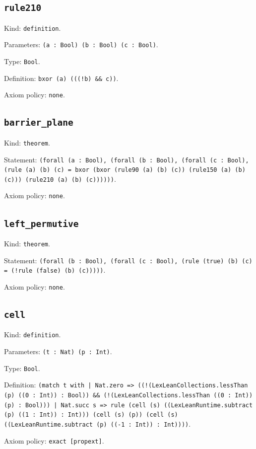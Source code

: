 \documentclass[11pt]{article}
\begin{document}
\subsection*{\texttt{rule210}}
\noindent Kind: \texttt{definition}.\par
\noindent Parameters: \texttt{(a : Bool) (b : Bool) (c : Bool)}.\par
\noindent Type: \texttt{Bool}.\par
\noindent Definition: \texttt{bxor (a) (((!b) \&\& c))}.\par
\noindent Axiom policy: \texttt{none}.\par
\subsection*{\texttt{barrier\_plane}}
\noindent Kind: \texttt{theorem}.\par
\noindent Statement: \texttt{(forall (a : Bool), (forall (b : Bool), (forall (c : Bool), (rule (a) (b) (c) = bxor (bxor (rule90 (a) (b) (c)) (rule150 (a) (b) (c))) (rule210 (a) (b) (c))))))}.\par
\noindent Axiom policy: \texttt{none}.\par
\subsection*{\texttt{left\_permutive}}
\noindent Kind: \texttt{theorem}.\par
\noindent Statement: \texttt{(forall (b : Bool), (forall (c : Bool), (rule (true) (b) (c) = (!rule (false) (b) (c)))))}.\par
\noindent Axiom policy: \texttt{none}.\par
\subsection*{\texttt{cell}}
\noindent Kind: \texttt{definition}.\par
\noindent Parameters: \texttt{(t : Nat) (p : Int)}.\par
\noindent Type: \texttt{Bool}.\par
\noindent Definition: \texttt{(match t with | Nat.zero => ((!(LexLeanCollections.lessThan (p) ((0 : Int)) : Bool)) \&\& (!(LexLeanCollections.lessThan ((0 : Int)) (p) : Bool))) | Nat.succ s => rule (cell (s) ((LexLeanRuntime.subtract (p) ((1 : Int)) : Int))) (cell (s) (p)) (cell (s) ((LexLeanRuntime.subtract (p) ((-1 : Int)) : Int))))}.\par
\noindent Axiom policy: \texttt{exact [propext]}.\par
\end{document}
